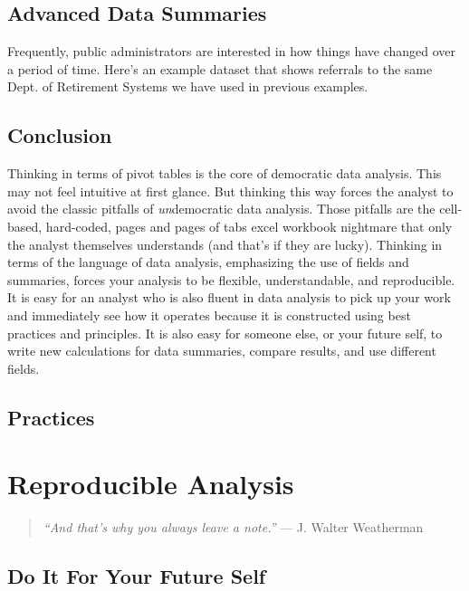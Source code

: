 \documentclass[]{book}
\begin{document}
\hypertarget{advanced-data-summaries}{%
\section{Advanced Data Summaries}\label{advanced-data-summaries}}

Frequently, public administrators are interested in how things have changed over a period of time. Here's an example dataset that shows referrals to the same Dept. of Retirement Systems we have used in previous examples.

\hypertarget{conclusion-1}{%
\section{Conclusion}\label{conclusion-1}}

Thinking in terms of pivot tables is the core of democratic data analysis. This may not feel intuitive at first glance. But thinking this way forces the analyst to avoid the classic pitfalls of \emph{un}democratic data analysis. Those pitfalls are the cell-based, hard-coded, pages and pages of tabs excel workbook nightmare that only the analyst themselves understands (and that's if they are lucky). Thinking in terms of the language of data analysis, emphasizing the use of fields and summaries, forces your analysis to be flexible, understandable, and reproducible. It is easy for an analyst who is also fluent in data analysis to pick up your work and immediately see how it operates because it is constructed using best practices and principles. It is also easy for someone else, or your future self, to write new calculations for data summaries, compare results, and use different fields.

\hypertarget{practices}{%
\section{Practices}\label{practices}}

\hypertarget{reproducible-analysis}{%
\chapter{Reproducible Analysis}\label{reproducible-analysis}}

\begin{quote}
\emph{``And that's why you always leave a note.''} --- J. Walter Weatherman
\end{quote}

\hypertarget{do-it-for-your-future-self}{%
\section{Do It For Your Future Self}\label{do-it-for-your-future-self}}
\end{document}
